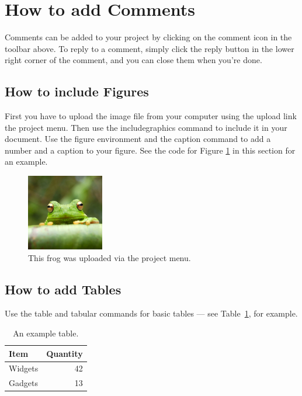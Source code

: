 \documentclass{article}
\begin{document}
\section{How to add Comments}

Comments can be added to your project by clicking on the comment icon in the toolbar above. %
%
%
To reply to a comment, simply click the reply button in the lower right corner of the comment, and you can close them when you're done.

\subsection{How to include Figures}

First you have to upload the image file from your computer using the upload link the project menu. Then use the includegraphics command to include it in your document. Use the figure environment and the caption command to add a number and a caption to your figure. See the code for Figure \ref{fig:frog} in this section for an example.

\begin{figure}
\centering
\includegraphics[width=0.3\textwidth]{frog.jpg}
\caption{\label{fig:frog}This frog was uploaded via the project menu.}
\end{figure}

\subsection{How to add Tables}

Use the table and tabular commands for basic tables --- see Table~\ref{tab:widgets}, for example. 

\begin{table}
\centering
\begin{tabular}{l|r}
Item & Quantity \\\hline
Widgets & 42 \\
Gadgets & 13
\end{tabular}
\caption{\label{tab:widgets}An example table.}
\end{table}
\end{document}
